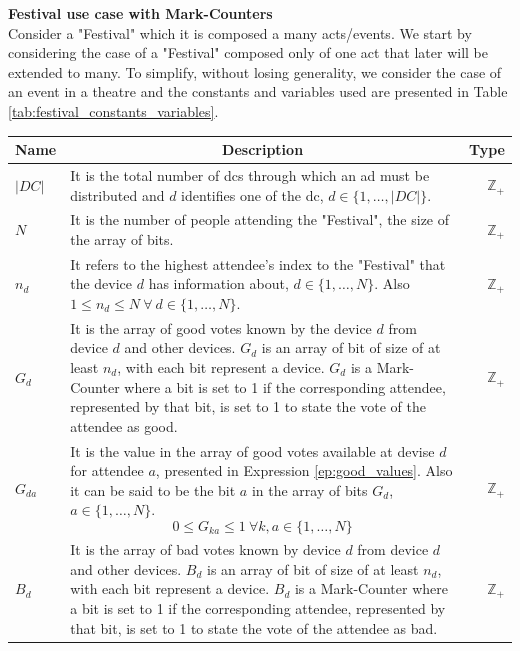 {\bf Festival use case with Mark-Counters} \\
Consider a "Festival" which it is composed a many acts/events. We start by considering the case of a "Festival" composed only of one act that later will be extended to many. To simplify, without losing generality, we consider the case of an event in a theatre and the constants and variables used are presented in Table \ref{tab:festival_constants_variables}.
\begin{table}[!ht]
	\begin{tabular}{|p{.5cm}|p{5.7cm}|r| }
		\hline
		\multicolumn{1}{|c|}{Name} & \multicolumn{1}{c|}{Description} & \multicolumn{1}{c|}{Type} \\
		\hline
		\hline
			$|DC|$ & It is the total number of \glspl{dc} through which an ad must be distributed and $d$ identifies one of the \gls{dc}, $d \in \{1,\dots, |DC|\}$. & $\mathbb{Z}_{+}$ \\
		\hline
			$N$ & It is the number of people attending the "Festival", the size of the array of bits. & $\mathbb{Z}_{+}$ \\
		\hline
			$n_{d}$ & It refers to the highest attendee's index to the "Festival" that the device $d$ has information about,  $d \in \{1,\dots, N\}$. Also $1 \le n_{d} \le N ~ \forall ~ d \in \{1,\dots, N\}$. & $\mathbb{Z}_{+}$ \\
		\hline
			$G_{d}$ & It is the array of good votes known by the device $d$ from device $d$ and other devices. $G_{d}$ is an array of bit of size of at least $n_{d}$, with each bit represent a device. $G_{d}$ is a Mark-Counter where a bit is set to 1 if the corresponding attendee, represented by that bit, is set to 1 to state the vote of the attendee as good. & $\mathbb{Z}_{+}$ \\
		\hline 
			$G_{da}$ & It is the value in the array of good votes available at devise $d$ for attendee $a$, presented in Expression \ref{ep:good_values}. Also it can be said to be the bit $a$ in the array of bits $G_{d}$, $a \in \{1,\dots, N\}$.
				\begin{equation} \label{ep:good_values}
					0 \le G_{ka} \le 1 ~ \forall k,a \in \{1,\dots, N\}
				\end{equation} & 
			$\mathbb{Z}_{+}$ \\
		\hline
			$B_{d}$ & It is the array of bad votes known by device $d$ from device $d$ and other devices. $B_{d}$ is an array of bit of size of at least $n_{d}$, with each bit represent a device. $B_{d}$ is a Mark-Counter where a bit is set to 1 if the corresponding attendee, represented by that bit, is set to 1 to state the vote of the attendee as bad. & $\mathbb{Z}_{+}$ \\

\end{tabular}
\end{table}
